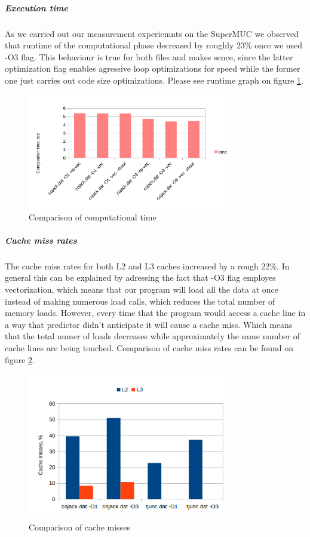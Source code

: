 \documentclass{article}
\begin{document}
\subparagraph{Execution time}
As we carried out our measurement experiemnts on the SuperMUC we observed that runtime of the computational phase decreased by roughly 23\% once we used -O3 flag. This behaviour is true for both files and makes sence, since the latter optimization flag enables agressive loop optimizations for speed while the former one just carries out code size optimizations. Please see runtime graph on figure \ref{fig:1}.
\begin{figure}[h]
	\begin{center}
		\includegraphics[width=0.8\textwidth]{comp-time} %
		\caption{Comparison of computational time}
		\label{fig:1}
	\end{center}
\end{figure}

\subparagraph{Cache miss rates}
The cache miss rates for both L2 and L3 caches increased by a rough 22\%. In general this can be explained by adressing the fact that -O3 flag employes vectorization, which means that our program will load all the data at once instead of making numerous load calls, which reduces the total number of memory loads. However, every time that the program would access a cache line in a way that predictor didn't anticipate it will cause a cache miss. Which means that the total numer of loads decreases while approximately the same number of cache lines are being touched. Comparison of cache miss rates can be found on figure \ref{fig:2}.
\begin{figure}[h]
	\begin{center}
		\includegraphics[width=0.8\textwidth]{cache-misses} %
		\caption{Comparison of cache misses}
		\label{fig:2}
	\end{center}
\end{figure}
\end{document}
